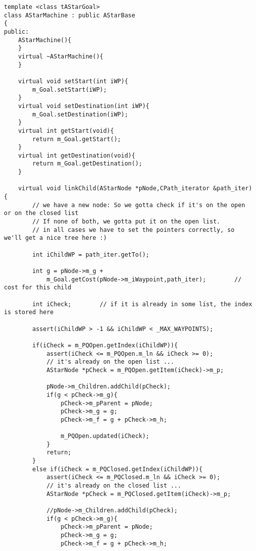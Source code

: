 \documentclass[12pt]{article}
\begin{document}
\scriptsize
\linespread{1.0}
\begin{verbatim}
template <class tAStarGoal>
class AStarMachine : public AStarBase
{
public:
    AStarMachine(){
    }
    virtual ~AStarMachine(){
    }

    virtual void setStart(int iWP){
        m_Goal.setStart(iWP);
    }
    virtual void setDestination(int iWP){
        m_Goal.setDestination(iWP);
    }
    virtual int getStart(void){
        return m_Goal.getStart();
    }
    virtual int getDestination(void){
        return m_Goal.getDestination();
    }
    
    virtual void linkChild(AStarNode *pNode,CPath_iterator &path_iter){
        // we have a new node: So we gotta check if it's on the open or on the closed list 
        // If none of both, we gotta put it on the open list.
        // in all cases we have to set the pointers correctly, so we'll get a nice tree here :)

        int iChildWP = path_iter.getTo();

        int g = pNode->m_g +
            m_Goal.getCost(pNode->m_iWaypoint,path_iter);        // cost for this child
        
        int iCheck;        // if it is already in some list, the index is stored here
        
        assert(iChildWP > -1 && iChildWP < _MAX_WAYPOINTS);
        
        if(iCheck = m_PQOpen.getIndex(iChildWP)){
            assert(iCheck <= m_PQOpen.m_ln && iCheck >= 0);
            // it's already on the open list ...
            AStarNode *pCheck = m_PQOpen.getItem(iCheck)->m_p;
            
            pNode->m_Children.addChild(pCheck);
            if(g < pCheck->m_g){
                pCheck->m_pParent = pNode;
                pCheck->m_g = g;
                pCheck->m_f = g + pCheck->m_h;
                
                m_PQOpen.updated(iCheck);
            }
            return;
        }
        else if(iCheck = m_PQClosed.getIndex(iChildWP)){
            assert(iCheck <= m_PQClosed.m_ln && iCheck >= 0);
            // it's already on the closed list ...
            AStarNode *pCheck = m_PQClosed.getItem(iCheck)->m_p;
            
            //pNode->m_Children.addChild(pCheck);
            if(g < pCheck->m_g){
                pCheck->m_pParent = pNode;
                pCheck->m_g = g;
                pCheck->m_f = g + pCheck->m_h;
                

\end{verbatim}
\end{document}
